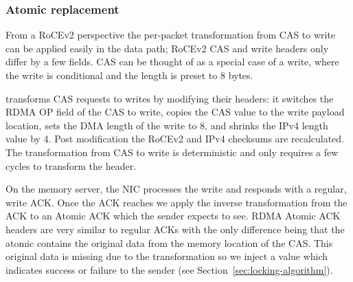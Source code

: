 \subsubsection{Atomic replacement} 

From a RoCEv2 perspective
the per-packet transformation from CAS to write can be applied easily
in the data path; RoCEv2 CAS and write headers only differ by a few
fields. CAS can be thought of as a special case of a write, where the
write is conditional and the length is preset to 8 bytes.

{\sword} transforms CAS requests to writes by modifying their headers: it
switches the RDMA OP field of the CAS to write, copies the CAS
value to the write payload location, sets the DMA length of the write
to 8, and shrinks the IPv4 length value by 4.  Post modification the RoCEv2
and IPv4 checksums are recalculated.
The transformation from CAS to write
is deterministic and only requires a few cycles to transform the
header.

On the memory server, the NIC processes the write and responds with a
regular, write ACK. Once the ACK reaches {\sword} we apply the
inverse transformation from the ACK to an Atomic ACK which the sender
expects to see.  RDMA Atomic ACK headers are very similar to regular
ACKs with the only difference being that the atomic contains the
original data from the memory location of the CAS. This original data
is missing due to the transformation so we inject a value which
indicates success or failure to the sender (see Section~\ref{sec:locking-algorithm}).





